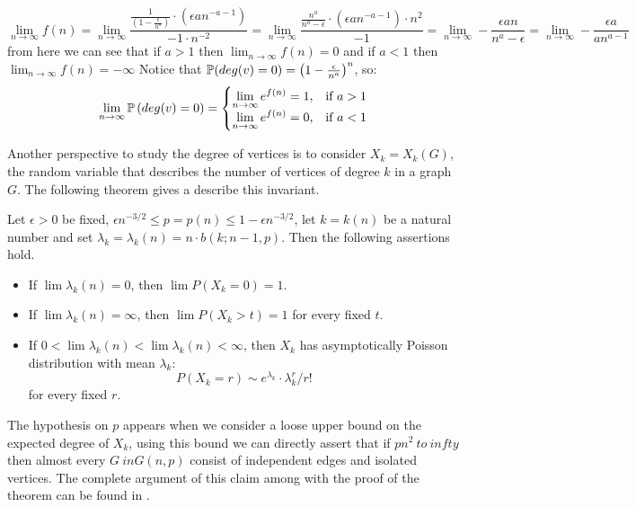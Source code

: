 $$\displaystyle\lim_{n\to \infty } f(n) = 
\displaystyle\lim_{n\to \infty } \frac{\frac{1}{\left( 1 - \frac{\epsilon}{n^a}\right)}\cdot (\epsilon a n^{-a-1})}
{-1\cdot n^{-2}} = 
\displaystyle\lim_{n\to \infty } \frac{\frac{n^a}{n^{a} - \epsilon}\cdot (\epsilon a n^{-a-1}) \cdot {n^{2}}}{-1} = 
\displaystyle\lim_{n\to \infty } - \frac{\epsilon a n}{n^{a} - \epsilon} =
\displaystyle\lim_{n\to \infty } - \frac{\epsilon a}{a n^{a-1}}
$$
from here we can see that if $a>1$ then $\displaystyle\lim_{n\to \infty } f(n) = 0$ and if $a<1$  then $\displaystyle\lim_{n\to \infty } f(n) = -\infty$
Notice that $\P(deg(v)=0) = \left(1 - \frac{\epsilon}{n^a} \right)^n$, so:
$$ \displaystyle\lim_{n\to \infty} \P\left(deg(v)=0\right) = \begin{cases} 
\displaystyle\lim_{n\to \infty}e^{f(n)} = 1, & \mbox{if } a>1 \\ 
\displaystyle\lim_{n\to \infty}e^{f(n)} = 0, & \mbox{if } a<1 \end{cases} $$

Another perspective to study the degree of vertices is to consider $X_{k} = X_{k} (G)$, the random variable that describes the number of vertices of degree $k$ in a graph $G$. The following theorem gives a describe this invariant.

\begin{theorem}
Let $\epsilon>0$ be fixed, $\epsilon n^{-3/2} \leq p = p(n) \leq 1 - \epsilon n^{-3/2}$, let $k = k(n)$ be a natural number and set $\lambda_{k} = \lambda_{k}(n) = n\cdot b(k;n - 1,p)$. Then the following assertions hold.

\begin{itemize}
\item If $\lim \lambda_{k}(n) = 0$, then $\lim P(X_{k} = 0) = 1$. 
\item If $\lim \lambda_{k}(n) = \infty$, then $\lim P(X_{k} > t) = 1$
for every fixed $t$.
\item If $0 < \lim\lambda_{k}(n) < \lim \lambda_{k}(n) < \infty$,
then $X_{k}$ has asymptotically Poisson distribution with mean $\lambda_{k}$: 
$$P(X_{k} = r) \sim e^{\lambda_{k}}\cdot \lambda_{k}^{r}/ r!$$
for every fixed $r$.
\end{itemize}
\end{theorem}

The hypothesis on $ p $ appears when we consider a loose upper bound on the expected degree of $ X_ {k} $, using this bound we can directly assert that if $ pn ^ {2} \ to \ infty $ then almost every $ G \ in G (n, p) $ consist of independent edges and isolated vertices. The complete argument of this claim among with the proof of the theorem can be found in \cite[Bollobás, p.61]{Bollobas}.

